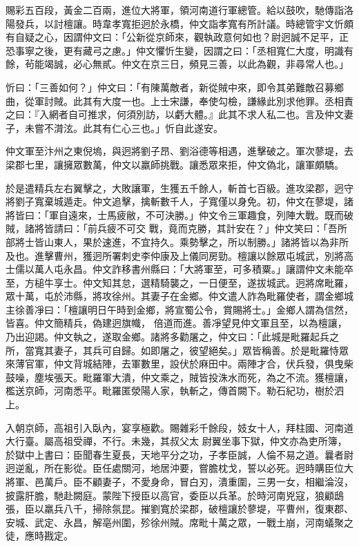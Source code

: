 \begin{pinyinscope}
 賜彩五百段，黃金二百兩，進位大將軍，領河南道行軍總管。給以鼓吹，馳傳詣洛陽發兵，以討檀讓。時韋孝寬拒迥於永橋，仲文詣孝寬有所計議。時總管宇文忻頗有自疑之心，因謂仲文曰：「公新從京師來，觀執政意何如也？尉迥誠不足平，正恐事寧之後，更有藏弓之慮。」仲文懼忻生變，因謂之曰：「丞相寬仁大度，明識有餘，茍能竭誠，必心無貳。仲文在京三日，頻見三善，以此為觀，非尋常人也。」



 忻曰：「三善如何？」仲文曰：「有陳萬敵者，新從賊中來，即令其弟難敵召募鄉曲，從軍討賊。此其有大度一也。上士宋謙，奉使勾檢，謙緣此別求他罪。丞相責
 之曰：『入網者自可推求，何須別訪，以虧大體。』此其不求人私二也。言及仲文妻子，未嘗不潸泫。此其有仁心三也。」忻自此遂安。



 仲文軍至汴州之東倪塢，與迥將劉子昂、劉浴德等相遇，進擊破之。軍次蓼堤，去梁郡七里，讓擁眾數萬，仲文以羸師挑戰。讓悉眾來拒，仲文偽北，讓軍頗驕。



 於是遣精兵左右翼擊之，大敗讓軍，生獲五千餘人，斬首七百級。進攻梁郡，迥守將劉子寬棄城遁走。仲文追擊，擒斬數千人，子寬僅以身免。初，仲文在蓼堤，諸將皆曰：「軍自遠來，士馬疲敝，不可決勝。」仲文令三軍趣食，列陣大戰。既而破賊，諸將皆請曰：「前兵疲不可交
 戰，竟而克勝，其計安在？」仲文笑曰：「吾所部將士皆山東人，果於速進，不宜持久。乘勢擊之，所以制勝。」諸將皆以為非所及也。進擊曹州，獲迥所署刺史李仲康及上儀同房勁。檀讓以餘眾屯城武，別將高士儒以萬人屯永昌。仲文詐移書州縣曰：「大將軍至，可多積粟。」讓謂仲文未能卒至，方槌牛享士。仲文知其怠，選精騎襲之，一日便至，遂拔城武。迥將席毗羅，眾十萬，屯於沛縣，將攻徐州。其妻子在金鄉。仲文遣人詐為毗羅使者，謂金鄉城主徐善凈曰：「檀讓明日午時到金鄉，將宣蜀公令，賞賜將士。」金鄉人謂為信然，皆喜。仲文簡精兵，偽建迥旗幟，
 倍道而進。善凈望見仲文軍且至，以為檀讓，乃出迎謁。仲文執之，遂取金鄉。諸將多勸屠之，仲文曰：「此城是毗羅起兵之所，當寬其妻子，其兵可自歸。如即屠之，彼望絕矣。」眾皆稱善。於是毗羅恃眾來薄官軍，仲文背城結陣，去軍數里，設伏於麻田中。兩陣才合，伏兵發，俱曳柴鼓噪，塵埃張天。毗羅軍大潰，仲文乘之，賊皆投洙水而死，為之不流。獲檀讓，檻送京師，河南悉平。毗羅匿滎陽人家，執斬之，傳首闕下。勒石紀功，樹於泗上。



 入朝京師，高祖引入臥內，宴享極歡。賜雜彩千餘段，妓女十人，拜柱國、河南道大行臺。屬高祖受禪，不行。未幾，其叔父太
 尉翼坐事下獄，仲文亦為吏所簿，於獄中上書曰：臣聞春生夏長，天地平分之功，子孝臣誠，人倫不易之道。曩者尉迥逆亂，所在影從。臣任處關河，地居沖要，嘗膽枕戈，誓以必死。迥時購臣位大將軍、邑萬戶。臣不顧妻子，不愛身命，冒白刃，潰重圍，三男一女，相繼淪沒，披露肝膽，馳赴闕庭。蒙陛下授臣以高官，委臣以兵革。於時河南兇寇，狼顧鴟張，臣以羸兵八千，掃除氛昆。摧劉寬於梁郡，破檀讓於蓼堤，平曹州，復東郡、安城、武定、永昌，解亳州圍，殄徐州賊。席毗十萬之眾，一戰土崩，河南蟻聚之徒，應時戡定。




\end{pinyinscope}
